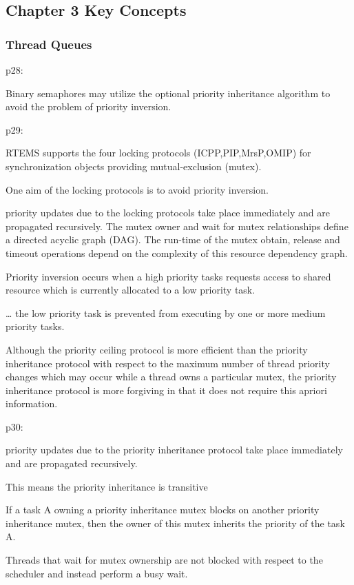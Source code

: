 \subsection{Chapter 3 Key Concepts}

\subsubsection{Thread Queues}

p28:

Binary semaphores may utilize the optional priority
inheritance algorithm to avoid the problem of priority inversion.

p29:

RTEMS supports the four locking protocols (ICPP,PIP,MrsP,OMIP)
for synchronization objects providing mutual-exclusion (mutex).

One aim of the
locking protocols is to avoid priority inversion.

priority updates due to the locking protocols take place immediately and are
propagated recursively.
The mutex owner and wait for mutex relationships define a directed
acyclic graph (DAG).
The run-time of the mutex obtain, release and timeout operations depend
on the complexity of this resource dependency graph.

Priority inversion occurs when a high priority tasks
requests access to shared resource
which is currently allocated to a low priority task.

\dots
the low priority task is prevented from executing by one or more medium priority
tasks.

Although the priority ceiling protocol is
more efficient than the priority inheritance protocol
with respect to the maximum number of
thread priority changes which may occur
while a thread owns a particular mutex,
the priority inheritance protocol is more forgiving
in that it does not require this apriori information.

p30:

priority updates due to the priority
inheritance protocol take place immediately and are propagated recursively.

This means the
priority inheritance is transitive

If a task A owning a priority inheritance
mutex blocks on another priority inheritance mutex, then the owner of this mutex inherits the
priority of the task A.

Threads that wait for mutex ownership are not blocked
with respect to the scheduler and instead
perform a busy wait.

